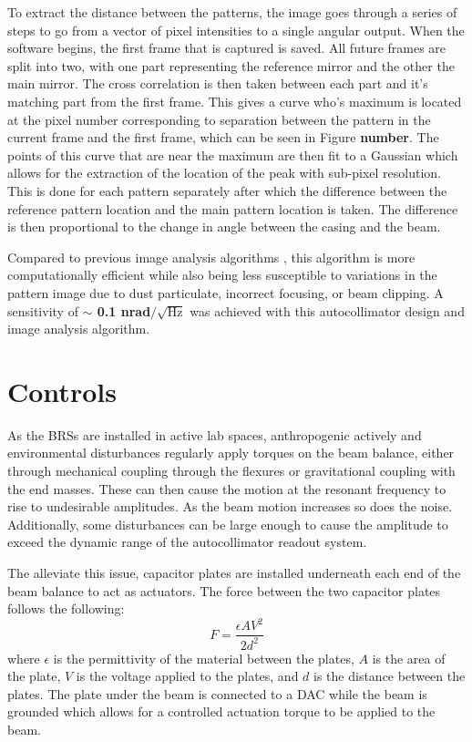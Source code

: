 \documentclass [12pt, proquest]{uwthesis}[2019]
\begin{document}
To extract the distance between the patterns, the image goes through a series of steps to go from a vector of pixel intensities to a single angular output. When the software begins, the first frame that is captured is saved. All future frames are split into two, with one part representing the reference mirror and the other the main mirror. The cross correlation is then taken between each part and it's matching part from the first frame. This gives a curve who's maximum is located at the pixel number corresponding to separation between the pattern in the current frame and the first frame, which can be seen in Figure \textbf{number}. The points of this curve that are near the maximum are then fit to a Gaussian which allows for the extraction of the location of the peak with sub-pixel resolution. This is done for each pattern separately after which the difference between the reference pattern location and the main pattern location is taken. The difference is then proportional to the change in angle between the casing and the beam.

Compared to previous image analysis algorithms \cite{MSAPaper}, this algorithm is more computationally efficient while also being less susceptible to variations in the pattern image due to dust particulate, incorrect focusing, or beam clipping. A sensitivity of \textbf{$\sim$ 0.1 nrad$/\sqrt{\text{Hz}}$} was achieved with this autocollimator design and image analysis algorithm.

\section{Controls}

\quad As the BRSs are installed in active lab spaces, anthropogenic actively and environmental disturbances regularly apply torques on the beam balance, either through mechanical coupling through the flexures or gravitational coupling with the end masses. These can then cause the motion at the resonant frequency to rise to undesirable amplitudes. As the beam motion increases so does the noise. Additionally, some disturbances can be large enough to cause the amplitude to exceed the dynamic range of the autocollimator readout system.

The alleviate this issue, capacitor plates are installed underneath each end of the beam balance to act as actuators. The force between the two capacitor plates follows the following: 
\[F=\frac{\epsilon A V^2}{2d^2}\]
where $\epsilon$ is the permittivity of the material between the plates, $A$ is the area of the plate, $V$ is the voltage applied to the plates, and $d$ is the distance between the plates. The plate under the beam is connected to a DAC while the beam is grounded which allows for a controlled actuation torque to be applied to the beam. 
\end{document}
